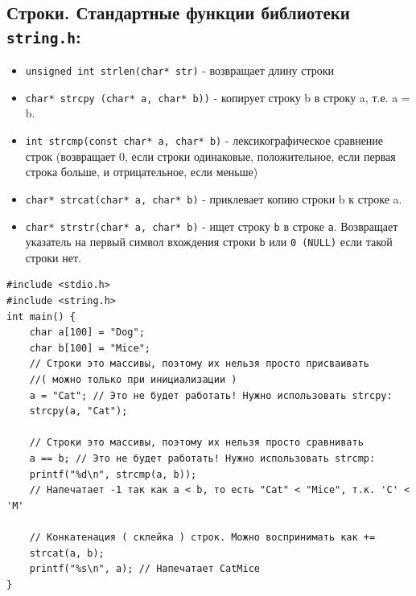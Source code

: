 \documentclass{article}
\begin{document}
\subsection{Строки. Стандартные функции библиотеки \texttt{string.h}:}
\begin{itemize}
\item \texttt{unsigned int strlen(char* str)} - возвращает длину строки
\item \texttt{char* strcpy (char* a, char* b))} - копирует строку b в строку a, т.е. a = b.
\item \texttt{int strcmp(const char* a, char* b)} - лексикографическое сравнение строк (возвращает 0, если строки одинаковые, положительное, если первая строка больше, и отрицательное, если меньше)
\item \texttt{char* strcat(char* a, char* b)} - приклевает копию строки b к строке a.
\item \texttt{char* strstr(char* a, char* b)} - ищет строку \texttt{b} в строке \texttt{a}. Возвращает указатель на первый символ вхождения строки \texttt{b} или \texttt{0 (NULL)} если такой строки нет.
\end{itemize}
\begin{lstlisting}
#include <stdio.h>
#include <string.h>
int main() {
	char a[100] = "Dog";
	char b[100] = "Mice";
	// Строки это массивы, поэтому их нельзя просто присваивать 
	//( можно только при инициализации )
	a = "Cat"; // Это не будет работать! Нужно использовать strcpy:
	strcpy(a, "Cat");
	
	// Строки это массивы, поэтому их нельзя просто сравнивать
	a == b; // Это не будет работать! Нужно использовать strcmp:
	printf("%d\n", strcmp(a, b)); 
	// Напечатает -1 так как a < b, то есть "Cat" < "Mice", т.к. 'C' < 'M'
	
	// Конкатенация ( склейка ) строк. Можно воспринимать как +=
	strcat(a, b);
	printf("%s\n", a); // Напечатает CatMice
}
\end{lstlisting}
\end{document}
